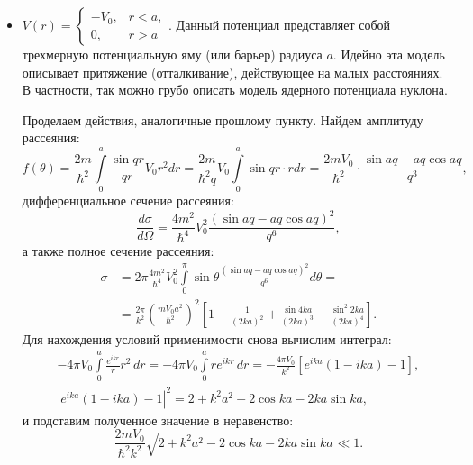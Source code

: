 \begin{itemize}
        Сравним с резерфордовским сечением:
        \[
          \frac{d\sigma}{d\Omega} =
          \left(\frac{q_1 q_2}{4E}\right)^2\frac{1}{\sin^4\frac{\theta}{2}}.
        \]
        Здесь $q_1$ и $q_2$ -- это заряды налетающей частицы и рассеивающего центра.
        Легко заметить, что полученная формула дифференциального сечения при $\alpha =
          q_1q_2$ полностью совпадает с формулой резерфордовского сечения.
  \item $V(r) = \begin{cases}
            -V_0, & r<a, \\ 0, & r>a
          \end{cases}$. Данный потенциал представляет собой трехмерную потенциальную яму (или
        барьер) радиуса $a$. Идейно эта модель описывает притяжение (отталкивание),
        действующее на малых расстояниях. В частности, так можно грубо описать модель
        ядерного потенциала нуклона.

        Проделаем действия, аналогичные прошлому пункту. Найдем амплитуду рассеяния:
        \[
          f(\theta) = \frac{2m}{\hbar^2}\int\limits_0^a\frac{\sin qr}{qr}V_0 r^2 dr =
          \frac{2m}{\hbar^2 q}V_0\int\limits_0^a \sin qr\cdot r dr =
          \frac{2mV_0}{\hbar^2}\cdot\frac{\sin aq - aq\cos aq}{q^3},
        \]
        дифференциальное сечение рассеяния:
        \[
          \frac{d\sigma}{d\Omega} = \frac{4m^2}{\hbar^4}V_0^2\frac{(\sin aq-aq\cos aq)^2}{q^6},
        \]
        а также полное сечение рассеяния:
        \begin{align*}
          \sigma &= 2\pi\frac{4m^2}{\hbar^4}V_0^2\int\limits_0^{\pi}\sin\theta
          \frac{(\sin aq - aq\cos aq)^2}{q^6}d\theta = \\
          &= \frac{2\pi}{k^2}\left(\frac{mV_0a^2}{\hbar^2}\right)^2
          \left[1-\frac{1}{(2ka)^2}+\frac{\sin 4ka}{(2ka)^3}-\frac{\sin^2 2ka}{(2ka)^4}\right].
        \end{align*}
        Для нахождения условий применимости снова вычислим интеграл:
        \begin{gather*}
          -4\pi V_0\int\limits_0^a \frac{e^{ikr}}{r}r^2\,dr =
          -4\pi V_0\int\limits_0^a r e^{ikr}\,dr = -\frac{4\pi V_0}{k^2}\left[e^{ika}(1-ika)-1\right], \\
          \left|e^{ika}(1-ika)-1\right|^2 = 2+k^2a^2-2\cos ka-2ka\sin ka,
        \end{gather*}
        и подставим полученное значение в неравенство:
        \[
          \frac{2mV_0}{\hbar^2 k^2}\sqrt{2+k^2a^2-2\cos ka-2ka\sin ka} \ll 1.
        \]


\end{itemize}
